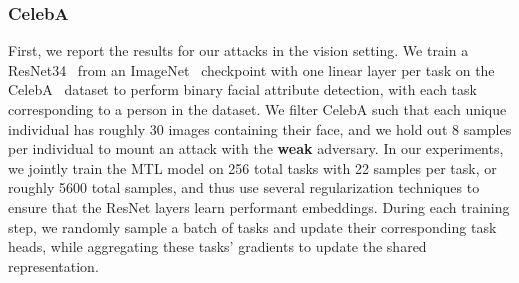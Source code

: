 








\subsubsection{CelebA} \label{sec:celeba}

First, we report the results for our attacks in the vision setting. We train a ResNet34~\cite{ResNet} from an ImageNet~\cite{imagenet} checkpoint with one linear layer per task on the CelebA~\cite{liu-2015-celeba} dataset to perform binary facial attribute detection, with each task corresponding to a person in the dataset. We filter CelebA such that each unique individual has roughly 30 images containing their face, and we hold out 8 samples per individual to mount an attack with the \textbf{weak} adversary. In our experiments, we jointly train the MTL model on 256 total tasks with 22 samples per task, or roughly 5600 total samples, and thus use several regularization techniques to ensure that the ResNet layers learn performant embeddings. During each training step, we randomly sample a batch of tasks and update their corresponding task heads, while aggregating these tasks' gradients to update the shared representation.

